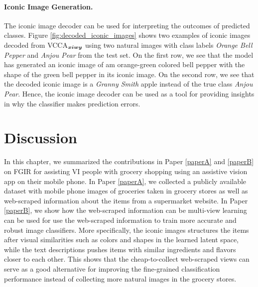 \paragraph{Iconic Image Generation.} The iconic image decoder can be used for interpreting the outcomes of predicted classes. Figure \ref{fig:decoded_iconic_images} shows two examples of iconic images decoded from VCCA$_{{\bm{x}} {\bm{i}} {\bm{w}} {\bm{y}}}$ using two natural images with class labels \textit{Orange Bell Pepper} and \textit{Anjou Pear} from the test set. On the first row, we see that the model has generated an iconic image of am orange-green colored bell pepper with the shape of the green bell pepper in its iconic image. On the second row, we see that the decoded iconic image is a \textit{Granny Smith} apple instead of the true class \textit{Anjou Pear}. Hence, the iconic image decoder can be used as a tool for providing insights in why the classifier makes prediction errors. 




\section{Discussion}\label{chap3:sec:discussion}

In this chapter, we summarized the contributions in Paper \ref{paperA} and \ref{paperB} on FGIR for assisting VI people with grocery shopping using an assistive vision app on their mobile phone. In Paper \ref{paperA}, we collected a publicly available dataset with mobile phone images of groceries taken in grocery stores as well as web-scraped information about the items from a supermarket website. In Paper \ref{paperB}, we show how the web-scraped information can be multi-view learning can be used for use the web-scraped information to train more accurate and robust image classifiers. More specifically, the iconic images structures the items after visual similarities such as colors and shapes in the learned latent space, while the text descriptions pushes items with similar ingredients and flavors closer to each other.
This shows that the cheap-to-collect web-scraped views can serve as a good alternative for improving the fine-grained classification performance instead of collecting more natural images in the grocery stores. 

